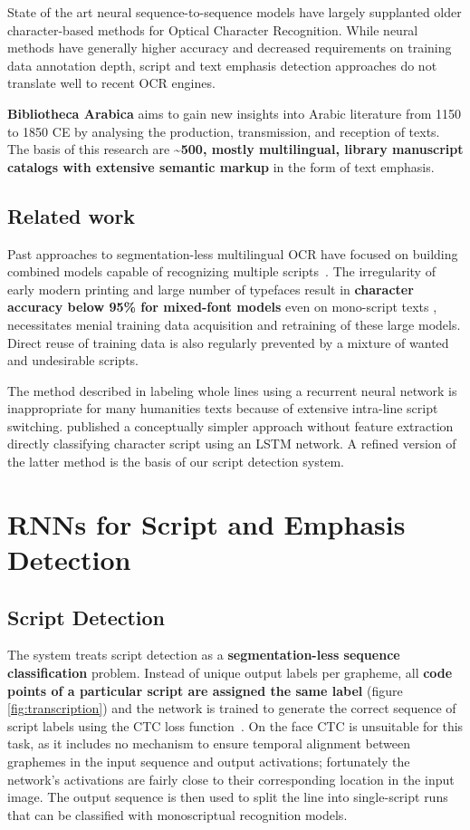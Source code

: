 State of the art neural sequence-to-sequence models have largely supplanted
older character-based methods for Optical Character Recognition. While neural
methods have generally higher accuracy and decreased requirements on training
data annotation depth, script and text emphasis detection approaches do not translate well to recent OCR engines.

\textbf{Bibliotheca Arabica} aims to gain new insights into Arabic literature from 1150
to 1850 CE by analysing the production, transmission, and reception of texts.
The basis of this research are \textbf{\textasciitilde 500, mostly
multilingual, library manuscript catalogs with extensive semantic
markup} in the form of text emphasis.

\subsection*{Related work}

Past approaches to segmentation-less multilingual OCR have focused on building
combined models capable of recognizing multiple
scripts~\cite{ul2013can}. The irregularity of early modern printing
and large number of typefaces result in \textbf{character accuracy below 95\%
for mixed-font models} even on mono-script texts \cite{springmann2016automatic},
necessitates menial training data acquisition and retraining of these
large models. Direct reuse of training data is also regularly prevented
by a mixture of wanted and undesirable scripts.

The method described in \cite{fujii2017sequence} labeling whole lines using a
recurrent neural network is inappropriate for many humanities texts
because of extensive intra-line script switching. \cite{ul2015sequence}
published a conceptually simpler approach without feature extraction
directly classifying character script using an LSTM network. A refined
version of the latter method is the basis of our script detection
system.

\section*{RNNs for Script and Emphasis Detection}

\subsection*{Script Detection}

The system treats script detection as a \textbf{segmentation-less sequence
classification} problem. Instead of unique output labels per grapheme, all \textbf{code
points of a particular script are assigned the same label} (figure
\ref{fig:transcription}) and the network is trained to generate the
correct sequence of script labels using the CTC loss
function~\cite{graves2006connectionist}. 
On the face CTC is unsuitable for this task, as it includes no mechanism to
ensure temporal alignment between graphemes in the input sequence and output
activations; fortunately the network's activations are fairly close to their
corresponding location in the input image. The output sequence is then
used to split the line into single-script runs that can be classified
with monoscriptual recognition models.


